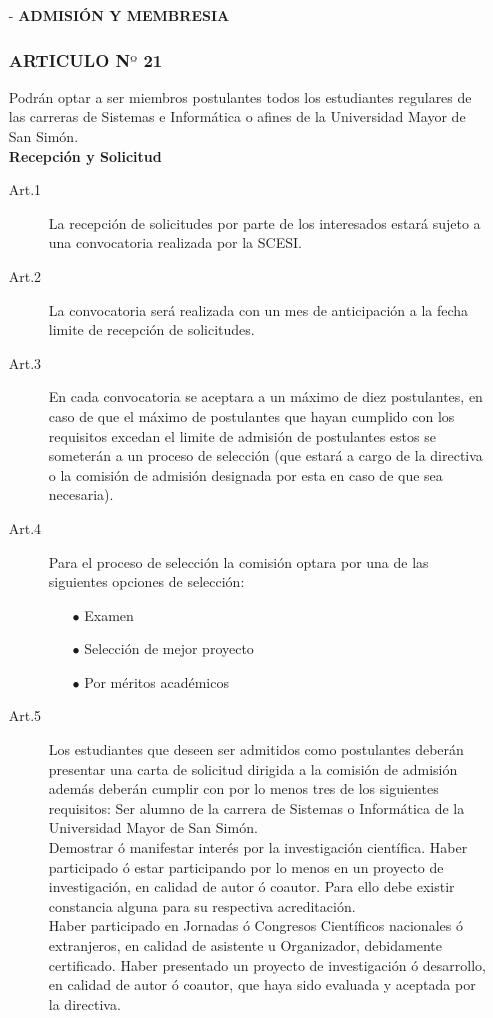 \documentclass[letterpaper,11pt]{book}
\begin{document}
\begin{itemize}
\item[-] {\bf ADMISIÓN Y MEMBRESIA}
\subsubsection*{ARTICULO N$º$ 21}
Podrán optar a ser miembros postulantes todos los estudiantes regulares de las carreras de Sistemas e Informática o afines de la Universidad Mayor de San Simón.\\ 
{\bf Recepción y Solicitud}\\
\begin{description}
\item[Art.1] La recepción de solicitudes por parte de los interesados estará sujeto a una 	convocatoria realizada por la SCESI.\\
\item[Art.2] La convocatoria será realizada con un mes de anticipación a la fecha limite de 	recepción de solicitudes.\\
\item[Art.3] En cada convocatoria se aceptara a un máximo de diez postulantes, en caso de que el máximo de postulantes que hayan cumplido con los requisitos excedan el limite de admisión de postulantes estos se someterán a un proceso de selección (que estará a cargo de la directiva o la comisión de admisión designada por esta en caso de que sea necesaria).\\
\item[Art.4] Para el proceso de selección la comisión optara por una de las siguientes opciones de selección:\\
\begin{itemize}
\item[$\bullet$] Examen 
\item[$\bullet$] Selección de mejor proyecto 
\item[$\bullet$] Por méritos académicos 
\end{itemize}
\item[Art.5] Los estudiantes que deseen ser admitidos como postulantes deberán presentar una carta de solicitud dirigida a la comisión de admisión además deberán cumplir con por lo menos tres de los siguientes requisitos: 
Ser alumno de la carrera de Sistemas o Informática de la Universidad Mayor de San Simón.\\
Demostrar ó manifestar interés por la investigación científica. 
Haber participado ó estar participando por lo menos en un proyecto de investigación, en calidad de autor ó coautor. Para ello debe existir constancia alguna para su respectiva acreditación. \\
Haber participado en Jornadas ó Congresos Científicos nacionales ó extranjeros, en calidad de asistente u Organizador, debidamente certificado. 
Haber presentado un proyecto de investigación ó desarrollo, en calidad de autor ó coautor, que haya sido evaluada y aceptada por la directiva.\\


\end{description}
\end{itemize}
\end{document}
